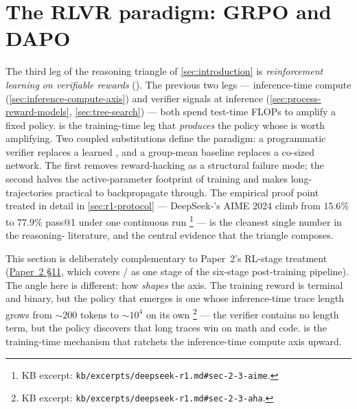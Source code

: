 
\section{The RLVR paradigm: GRPO and DAPO}
\label{sec:rlvr-grpo-dapo}
\label{sec:rlvr}

The third leg of the reasoning triangle of \cref{sec:introduction} is
\emph{reinforcement learning on verifiable rewards} (). The previous
two legs --- inference-time compute (\cref{sec:inference-compute-axis})
and verifier signals at inference (\cref{sec:process-reward-models},
\cref{sec:tree-search}) --- both spend test-time FLOPs to amplify a
fixed policy.  is the training-time leg that \emph{produces} the
policy whose  is worth amplifying. Two coupled
substitutions define the paradigm: a programmatic verifier replaces a
learned , and a group-mean baseline replaces a co-sized
 network. The first removes reward-hacking as a structural failure
mode; the second halves the active-parameter footprint of training and
makes long- trajectories practical to backpropagate through. The
empirical proof point treated in detail in \cref{sec:r1-protocol} ---
DeepSeek-'s AIME 2024 climb from $15.6\%$ to $77.9\%$ pass@1
under one continuous  run \citep[\S
2.3]{deepseek-r1}\footnote{KB excerpt:
\texttt{kb/excerpts/deepseek-r1.md\#sec-2-3-aime}.} --- is the cleanest
single number in the reasoning- literature, and the central evidence
that the triangle composes.

This section is deliberately complementary to Paper~2's RL-stage
treatment (\hyperref[P2-sec:rlvr-grpo]{Paper~2 §11}, which covers / as one stage of the
six-stage post-training pipeline). The angle here is different: how
 \emph{shapes} the  axis. The training reward is
terminal and binary, but the policy that emerges is one whose
inference-time trace length grows from $\sim\!200$ tokens to
$\sim\!10^4$ on its own \citep[\S 2.3]{deepseek-r1}\footnote{KB excerpt:
\texttt{kb/excerpts/deepseek-r1.md\#sec-2-3-aha}.} --- the verifier
contains no length term, but the policy discovers that long traces win
on math and code.  is the training-time mechanism that ratchets
the inference-time compute axis upward.

